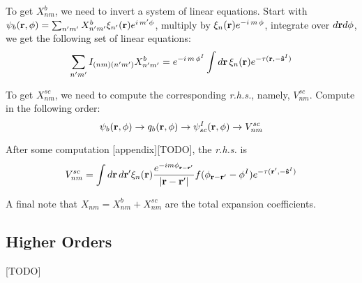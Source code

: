 \documentclass[main]{subfiles}
\begin{document}
To get $X^b_{nm}$, we need to invert a system of linear equations. Start with
$\psi_b(\mathbf{r},\phi)=\sum\nolimits_{n^{\prime} m^{\prime}}X^b_{n^{\prime} m^{\prime}}
\xi_{n^{\prime}}(\mathbf{r})e^{i\,m^{\prime}\phi}$, multiply by $\xi_n(\mathbf{r})e^{-i\,m\,\phi}$,
integrate over $d\mathbf{r}d\phi$, we get the following set of linear equations:
\begin{equation*}
	\sum\limits_{n^{\prime} m^{\prime}} I_{(nm)(n^{\prime} m^{\prime})} X^b_{n^{\prime} m^{\prime}} =
	e^{-i\,m\,\phi^I}\int d\mathbf{r}\,\xi_n(\mathbf{r}) e^{-\tau(\mathbf{r},-\mathbf{\hat{s}}^I)}
\end{equation*}

To get $X^{sc}_{nm}$, we need to compute the corresponding \textit{r.h.s.},
namely, $V^{sc}_{nm}$. Compute in the following order:
\begin{equation*}
	\psi_b(\mathbf{r},\phi) \to q_b(\mathbf{r},\phi) \to \psi^I_{sc}(\mathbf{r},\phi) \to
	V^{sc}_{nm}
\end{equation*}

After some computation [appendix][TODO], the \textit{r.h.s.} is
\begin{equation*}
	V^{sc}_{nm}=\int d\mathbf{r}\,d\mathbf{r}^{\prime}\xi_n(\mathbf{r}) 
	\frac{e^{-im\phi_{\mathbf{r}-\mathbf{r}^{\prime}}}}{\left| \mathbf{r}-\mathbf{r}^{\prime} \right|}
	f(\phi_{\mathbf{r}-\mathbf{r}^{\prime}}-\phi^I) e^{-\tau(\mathbf{r}^{\prime},-\mathbf{\hat{s}}^I)}
\end{equation*}

A final note that $X_{nm}=X^{b}_{nm}+X^{sc}_{nm}$ are the total expansion
coefficients.

\subsection{Higher Orders}
\label{sub:higher orders} 
[TODO]

\end{document}
